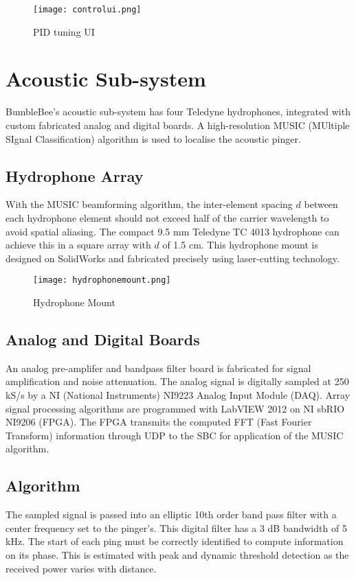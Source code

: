 \documentclass[journal,12pt]{IEEEtran}
\begin{document}
\begin{figure}[h]
\centering
\texttt{[image: controlui.png]}
\caption{PID tuning UI}
\captionsetup{justification=centering}
\end{figure}

\section{Acoustic Sub-system}
BumbleBee's acoustic sub-system has four Teledyne hydrophones, integrated with custom fabricated analog and digital boards. A high-resolution MUSIC (MUltiple SIgnal Classification) algorithm is used to localise the acoustic pinger. 

\subsection{Hydrophone Array}
With the MUSIC beamforming algorithm, the inter-element spacing $d$ between each hydrophone element should not exceed half of the carrier wavelength to avoid spatial aliasing. The compact 9.5 mm Teledyne TC 4013 hydrophone can achieve this in a square array with $d$ of 1.5 cm. This hydrophone mount is designed on SolidWorks and fabricated precisely using laser-cutting technology.

\begin{figure}[h]
\centering
\texttt{[image: hydrophonemount.png]}
\caption{Hydrophone Mount}
\end{figure}

\subsection{Analog and Digital Boards}
An analog pre-amplifer and bandpass filter board is fabricated for signal amplification and noise attenuation. The analog signal is digitally sampled at 250 kS/s by a NI (National Instruments) NI9223 Analog Input Module (DAQ). Array signal processing algorithms are programmed with LabVIEW 2012 on NI sbRIO NI9206 (FPGA). The FPGA transmits the computed FFT (Fast Fourier Transform) information through UDP to the SBC for application of the MUSIC algorithm.

\subsection{Algorithm}
The sampled signal is passed into an elliptic 10th order band pass filter with a center frequency set to the pinger's. This digital filter has a 3 dB bandwidth of 5 kHz. The start of each ping must be correctly identified to compute information on its phase. This is estimated with peak and dynamic threshold detection as the received power varies with distance. \\
\end{document}
